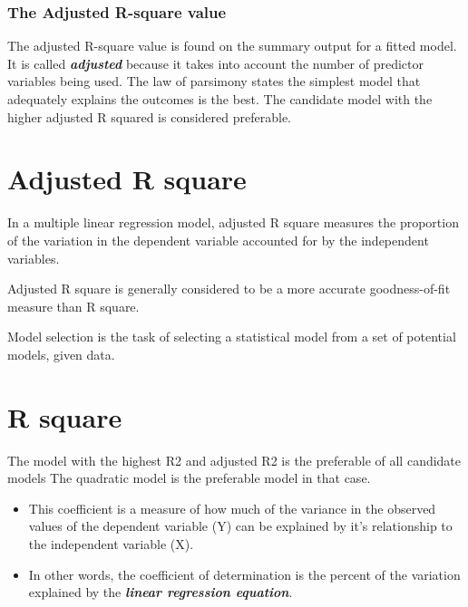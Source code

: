 \subsubsection*{The Adjusted R-square value}
\noindent The adjusted R-square value is found on the summary output for a fitted model. It is called \textbf{\emph{adjusted}} because it takes into account the number of predictor variables being used. The law of parsimony states the simplest model that adequately explains the outcomes is the best. The candidate model with the higher adjusted R squared is considered preferable.





\section{Adjusted R square}

In a multiple linear regression model, adjusted R square measures the proportion of the variation in the dependent variable 
accounted for by the independent variables.  

Adjusted R square is generally considered to be a more accurate goodness-of-fit measure than R square.



Model selection is the task of selecting a statistical model from a set of potential models, given data.





\newpage

\section{R square}
The model with the highest R2 and adjusted R2  is the preferable of all candidate models
The quadratic model is the preferable model in that case.



\begin{itemize}
\item
This coefficient is a measure of how much of the variance in the observed values of the dependent variable (Y) can be explained by it's relationship to the independent variable (X).
\item In other words, the coefficient of determination is the percent of the variation explained by the \textbf{\textit{linear regression equation}}.
\end{itemize}


